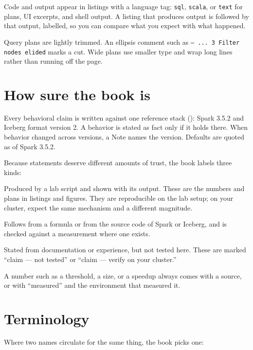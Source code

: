 Code and output appear in listings with a language tag: \texttt{sql}, \texttt{scala},
or \texttt{text} for plans, UI excerpts, and shell output. A listing that produces
output is followed by that output, labelled, so you can compare what you expect with
what happened.

Query plans are lightly trimmed. An ellipsis comment such as
\texttt{-- ... 3 Filter nodes elided} marks a cut. Wide plans use smaller type and
wrap long lines rather than running off the page.

\section*{How sure the book is}

Every behavioral claim is written against one reference stack
(): Spark 3.5.2 and Iceberg format version 2. A behavior is stated
as fact only if it holds there. When behavior changed across versions, a Note names
the version. Defaults are quoted as of Spark 3.5.2.

Because statements deserve different amounts of trust, the book labels three kinds:

\begin{description}[leftmargin=0pt, labelindent=0pt, itemsep=4pt]
  \item[Measured.] Produced by a lab script and shown with its output. These are
  the numbers and plans in listings and figures. They are reproducible on the lab
  setup; on your cluster, expect the same mechanism and a different magnitude.
  \item[Derived.] Follows from a formula or from the source code of Spark or
  Iceberg, and is checked against a measurement where one exists.
  \item[Claimed.] Stated from documentation or experience, but not tested here.
  These are marked ``claim --- not tested'' or ``claim --- verify on your
  cluster.''
\end{description}

A number such as a threshold, a size, or a speedup always comes with a source, or
with ``measured'' and the environment that measured it.

\section*{Terminology}

Where two names circulate for the same thing, the book picks one:

